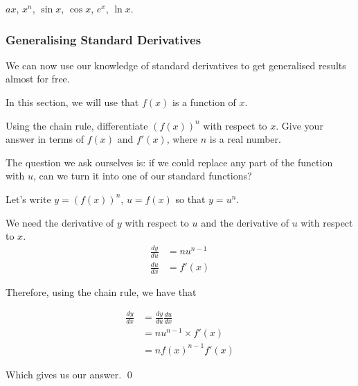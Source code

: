 $ax$, $x^n$, $\sin x$, $\cos x$, $e^x$, $\ln x$.

\subsubsection{Generalising Standard Derivatives} \label{sec:standard-derivatives-chain-rule}

We can now use our knowledge of standard derivatives to get generalised results almost for free.

In this section, we will use that $f(x)$ is a function of $x$.

\begin{example}
    Using the chain rule, differentiate $(f(x))^n$ with respect to $x$. Give your answer in terms of $f(x)$ and $f'(x)$, where $n$ is a real number.
\end{example}
\begin{solution}

    The question we ask ourselves is: if we could replace any part of the function with $u$, can we turn it into one of our standard functions?

    Let's write $y = (f(x))^n$, $u = f(x)$ so that $y = u^n$.

    We need the derivative of $y$ with respect to $u$ and the derivative of $u$ with respect to $x$.
    \begin{align*}
        \frac{dy}{du} &= nu^{n-1} \tag{using the derivative of $u^n$} \\
        \frac{du}{dx} &= f'(x) \tag{in terms of $f'(x)$}
    \end{align*}

    Therefore, using the chain rule, we have that 

    \begin{align*}
        \frac{dy}{dx} &= \frac{dy}{du} \frac{du}{dx} \\
         &= nu^{n-1} \times f'(x)  \tag{substituting our workings} \\
         &= nf(x)^{n-1}f'(x) \tag{using $u = f(x)$}
    \end{align*}

    Which gives us our answer.
    \qed
\end{solution}

